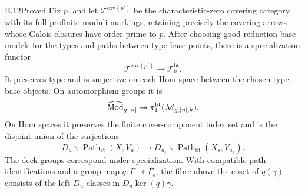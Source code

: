 \begin{claim}{E.12}{Proved}
Fix $p$, and let $\mathcal T^{\mathrm{cov}(p')}$ be the
characteristic-zero covering category with its full profinite
moduli markings, retaining precisely the covering arrows whose
Galois closures have order prime to $p$. After choosing good
reduction base models for the types and paths between type
base points, there is a specialization functor
\[
                 \mathcal T^{\mathrm{cov}(p')}
                     \longrightarrow \mathcal T_k^{\mathrm{bt}}.
\]
It preserves type and is surjective on each Hom space between
the chosen type base objects. On automorphism groups it is
\[
 \widehat{\operatorname{Mod}}_{g,[n]}
       \twoheadrightarrow\pi_1^{\mathrm{bt}}(\mathcal M_{g,[n],k}).
\]
On Hom spaces it preserves the finite cover-component index
set and is the disjoint union of the surjections
\[
 D_u\backslash\operatorname{Path}_{\mathrm{et}}(X,V_u)
    \longrightarrow
 D_{u_s}\backslash\operatorname{Path}_{\mathrm{bt}}(X_s,V_{u_s}).
\]
The deck groups correspond under specialization. With compatible
path identifications and a group map $q:\Gamma\twoheadrightarrow
\Gamma_s$, the fibre above the coset of $q(\gamma)$ consists of
the left-$D_u$ classes in $D_u\ker(q)\gamma$.
\end{claim}
